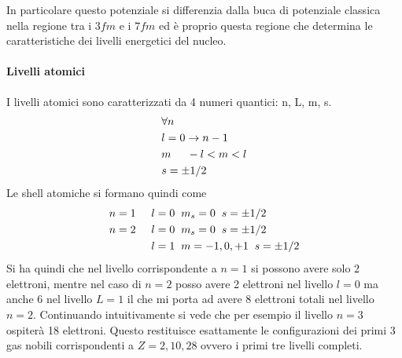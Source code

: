 In particolare questo potenziale si differenzia dalla buca di potenziale classica nella regione tra i $3fm$ e i $7fm$ ed è proprio questa regione che determina le caratteristiche dei livelli energetici del nucleo.
\paragraph{Livelli atomici}
I livelli atomici sono caratterizzati da 4 numeri quantici: n, L, m, s.
\begin{equation}
\begin{split}
&\forall n\\
&l=0\to n-1\\
&m\hspace{0.5cm}-l<m<l\\
&s=\pm 1/2
\end{split}
\end{equation}
Le shell atomiche si formano quindi come
\begin{equation}
\begin{split}
n=1\hspace{0.5cm}&l=0\hspace{0.2cm}m_s=0\hspace{0.2cm}s=\pm 1/2\\
n=2\hspace{0.5cm}&l=0\hspace{0.2cm}m_s=0\hspace{0.2cm}s=\pm 1/2\\
&l=1\hspace{0.2cm}m=-1,0,+1\hspace{0.2cm}s=\pm1/2
\end{split}
\end{equation}
Si ha quindi che nel livello corrispondente a $n=1$ si possono avere solo 2 elettroni, mentre nel caso di $n=2$ posso avere 2 elettroni nel livello $l=0$ ma anche 6 nel livello $L=1$ il che mi porta ad avere 8 elettroni totali nel livello $n=2$.
Continuando intuitivamente si vede che per esempio il livello $n=3$ ospiterà 18 elettroni.
Questo restituisce esattamente le configurazioni dei primi 3 gas nobili corrispondenti a $Z=2,10,28$ ovvero i primi tre livelli completi.

